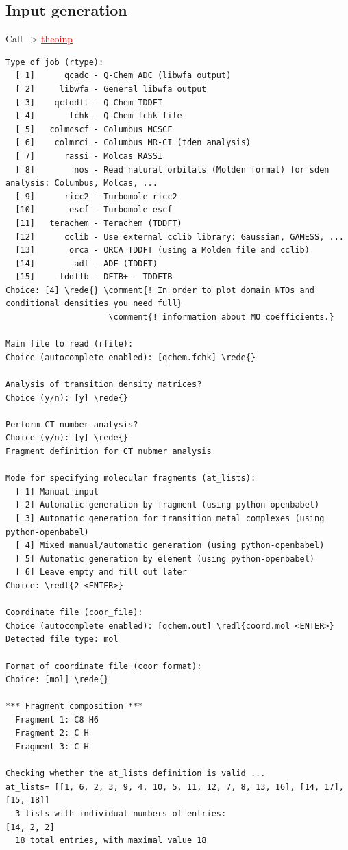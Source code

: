 \documentclass[DIV=12,headings=normal]{scrartcl}
\newcommand{\comment}[1]{\textcolor{blue}{#1}}
\newcommand{\redl}[1]{{\textcolor{red}{\underline{#1}}}}
\newcommand{\rede}[1]{\redl{#1 <ENTER>}}
\newcommand{\comm}[1]{
\small
~> \redl{#1}
\normalsize
}
\newcounter{number}
\begin{document}
\subsection{Input generation}
Call \comm{theoinp}
\scriptsize
\begin{Verbatim}[commandchars=\\\{\}]
Type of job (rtype):
  [ 1]      qcadc - Q-Chem ADC (libwfa output)
  [ 2]     libwfa - General libwfa output
  [ 3]    qctddft - Q-Chem TDDFT
  [ 4]       fchk - Q-Chem fchk file
  [ 5]   colmcscf - Columbus MCSCF
  [ 6]    colmrci - Columbus MR-CI (tden analysis)
  [ 7]      rassi - Molcas RASSI
  [ 8]        nos - Read natural orbitals (Molden format) for sden analysis: Columbus, Molcas, ...
  [ 9]      ricc2 - Turbomole ricc2
  [10]       escf - Turbomole escf
  [11]   terachem - Terachem (TDDFT)
  [12]      cclib - Use external cclib library: Gaussian, GAMESS, ...
  [13]       orca - ORCA TDDFT (using a Molden file and cclib)
  [14]        adf - ADF (TDDFT)
  [15]     tddftb - DFTB+ - TDDFTB
Choice: [4] \rede{} \comment{! In order to plot domain NTOs and conditional densities you need full}
                     \comment{! information about MO coefficients.}

Main file to read (rfile):
Choice (autocomplete enabled): [qchem.fchk] \rede{}

Analysis of transition density matrices?
Choice (y/n): [y] \rede{}

Perform CT number analysis?
Choice (y/n): [y] \rede{}
Fragment definition for CT nubmer analysis

Mode for specifying molecular fragments (at_lists):
  [ 1] Manual input
  [ 2] Automatic generation by fragment (using python-openbabel)
  [ 3] Automatic generation for transition metal complexes (using python-openbabel)
  [ 4] Mixed manual/automatic generation (using python-openbabel)
  [ 5] Automatic generation by element (using python-openbabel)
  [ 6] Leave empty and fill out later
Choice: \redl{2 <ENTER>}

Coordinate file (coor_file):
Choice (autocomplete enabled): [qchem.out] \redl{coord.mol <ENTER>} 
Detected file type: mol

Format of coordinate file (coor_format):
Choice: [mol] \rede{} 

*** Fragment composition ***
  Fragment 1: C8 H6 
  Fragment 2: C H 
  Fragment 3: C H 

Checking whether the at_lists definition is valid ...
at_lists= [[1, 6, 2, 3, 9, 4, 10, 5, 11, 12, 7, 8, 13, 16], [14, 17], [15, 18]]
  3 lists with individual numbers of entries:
[14, 2, 2]
  18 total entries, with maximal value 18


\end{Verbatim}
\end{document}
